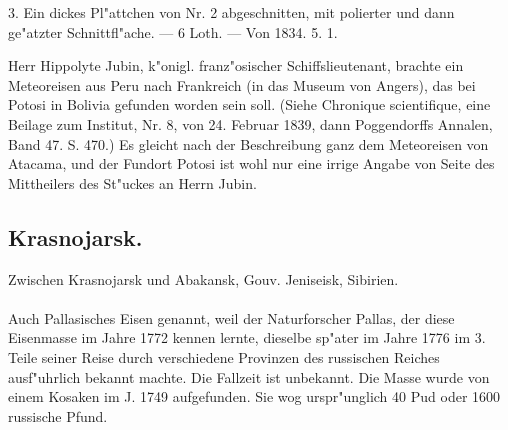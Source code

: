 \documentclass[a4paper, 11pt, oneside, polutonikogreek, german]{article}
\begin{document}
3. Ein dickes Pl"attchen von Nr. 2 abgeschnitten, mit polierter und dann ge"atzter Schnittfl"ache. --- 6 Loth. --- Von 1834. 5. 1.

\setlength{\leftskip}{10mm}
\setlength{\parindent}{0pt}

{\footnotesize Herr Hippolyte Jubin, k"onigl. franz"osischer Schiffslieutenant, brachte ein Meteoreisen aus Peru nach Frankreich (in das Museum von Angers), das bei Potosi in Bolivia gefunden worden sein soll. (Siehe Chronique scientifique, eine Beilage zum Institut, Nr. 8, von 24. Februar 1839, dann Poggendorffs Annalen, Band 47. S. 470.) Es gleicht nach der Beschreibung ganz dem Meteoreisen von Atacama, und der Fundort Potosi ist wohl nur eine irrige Angabe von Seite des Mittheilers des St"uckes an Herrn Jubin.}

\setlength{\leftskip}{0pt}
\setlength{\parindent}{20pt}

\subsection{Krasnojarsk.}
\begin{center}
\small
Zwischen Krasnojarsk und Abakansk, Gouv. Jeniseisk, Sibirien.
\end{center}
\paragraph{}
Auch Pallasisches Eisen genannt, weil der Naturforscher Pallas, der diese Eisenmasse im Jahre 1772 kennen lernte, dieselbe sp"ater im Jahre 1776 im 3. Teile seiner Reise durch verschiedene Provinzen des russischen Reiches ausf"uhrlich bekannt machte. Die Fallzeit ist unbekannt. Die Masse wurde von einem Kosaken im J. 1749 aufgefunden. Sie wog urspr"unglich 40 Pud oder 1600 russische Pfund.

\setlength{\leftskip}{10mm}
\setlength{\parindent}{0pt}
\end{document}
